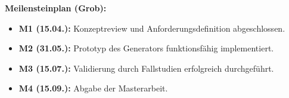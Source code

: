 \documentclass[11pt, a4paper]{article}
\begin{document}
\vspace{1cm}
\textbf{Meilensteinplan (Grob):}
\begin{itemize}
    \item \textbf{M1 (15.04.):} Konzeptreview und Anforderungsdefinition abgeschlossen.
    \item \textbf{M2 (31.05.):} Prototyp des Generators funktionsfähig implementiert.
    \item \textbf{M3 (15.07.):} Validierung durch Fallstudien erfolgreich durchgeführt.
    \item \textbf{M4 (15.09.):} Abgabe der Masterarbeit.
\end{itemize}
\end{document}
